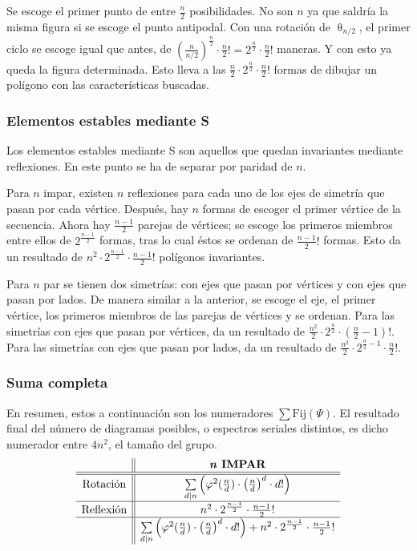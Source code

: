 		Se escoge el primer punto de entre $\frac{n}{2}$ posibilidades. No son $n$ ya que saldría la misma figura si se escoge el punto antipodal.
		Con una rotación de $\uptheta_{{n}/{2}}$, el primer ciclo se escoge igual que antes, de $\left(\frac{n}{n/2}\right)^{\frac{n}{2}}\cdot \frac{n}{2}!=2^{\frac{n}{2}}\cdot \frac{n}{2}!$ maneras. Y con esto ya queda la figura determinada. Esto lleva a las $\frac{n}{2}\cdot2^{\frac{n}{2}}\cdot\frac{n}{2}!$ formas de dibujar un polígono con las características buscadas.
		
		\subsubsection{Elementos estables mediante S}
		
		Los elementos estables mediante S son aquellos que quedan invariantes mediante reflexiones. En este punto se ha de separar por paridad de $n$. 
		
		Para $n$ impar, existen $n$ reflexiones para cada uno de los ejes de simetría que pasan por cada vértice. Después, hay $n$ formas de escoger el primer vértice de la secuencia. Ahora hay $\frac{n-1}{2}$ parejas de vértices; se escoge los primeros miembros entre ellos de $2^{\frac{n-1}{2}}$ formas, tras lo cual éstos se ordenan de $\frac{n-1}{2}!$ formas. Esto da un resultado de  $n^2\cdot2^{\frac{n-1}{2}}\cdot\frac{n-1}{2}!$ polígonos invariantes.
		
		Para $n$ par se tienen dos simetrías: con ejes que pasan por vértices y con ejes que pasan por lados. De manera similar a la anterior, se escoge el eje, el primer vértice, los primeros miembros de las parejas de vértices y se ordenan. Para las simetrías con ejes que pasan por vértices, da un resultado de  $\frac{n^2}{2}\cdot2^{\frac{n}{2}}\cdot\left(\frac{n}{2}-1\right)!$. Para las simetrías con ejes que pasan por lados, da un resultado de $\frac{n^2}{2}\cdot2^{\frac{n}{2}-1}\cdot\frac{n}{2}!$.
		
		\subsubsection*{Suma completa}
		
		En resumen, estos a continuación son los numeradores $\sum%
		\mbox{Fij}(\Psi)$. El resultado final del número de diagramas posibles, o espectros seriales distintos, es dicho numerador entre $4n^2$, el tamaño del grupo. 	
		\def\arraystretch{1.5}
		\[\begin{array}{c||c}
		&\textbf{\textit{n} IMPAR}\\\hline\hline
		\mbox{Rotación}&\sum\limits_{d|n}\left(\varphi^2(\frac{n}{d})\cdot\left(\frac{n}{d}\right)^d\cdot d!\right)\\\hline
		\mbox{Reflexión}&n^2\cdot2^{\frac{n-1}{2}}\cdot\frac{n-1}{2}!\\\hline
		&\sum\limits_{d|n}\left(\varphi^2(\frac{n}{d})\cdot\left(\frac{n}{d}\right)^d\cdot d!\right)+n^2\cdot2^{\frac{n-1}{2}}\cdot\frac{n-1}{2}!\\
		\end{array}\]
		
